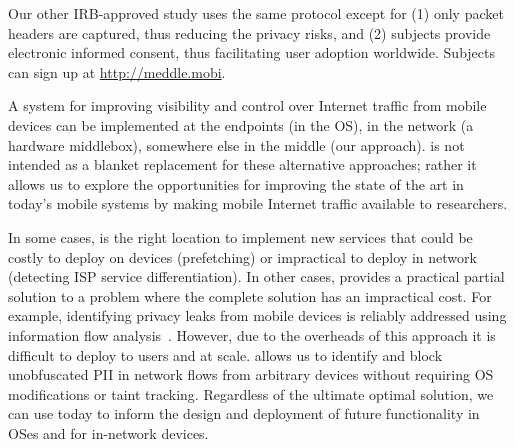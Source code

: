 Our other IRB-approved \meddle study uses the same protocol except 
for (1) only packet headers are captured, thus reducing the privacy risks, 
and (2) subjects provide electronic informed 
consent, thus facilitating user adoption worldwide. Subjects can sign up at \url{http://meddle.mobi}.

 A system for improving visibility and control over Internet traffic from mobile 
devices can be implemented at the endpoints (\eg in the OS), in the network (\eg a hardware middlebox), 
somewhere else in the middle (our approach). \meddle is not intended as a blanket replacement for 
these alternative approaches; rather it allows us to explore the opportunities for improving the state of the 
art in today's mobile systems by making mobile Internet traffic available to researchers. 

In some cases, \meddle is the right location to implement new services that could be costly 
to deploy on devices (prefetching) or impractical to deploy in network (detecting ISP service differentiation). 
In other cases, \meddle provides a practical partial solution to a problem where the complete solution has an impractical 
cost. For example, identifying privacy leaks from mobile devices is reliably addressed using information flow 
analysis~\cite{enck:taintdroid}. However, due to the overheads of this approach it is difficult to deploy to users 
and at scale. \meddle allows us to identify and block unobfuscated PII in network flows from arbitrary devices without requiring 
OS modifications or taint tracking. Regardless of the ultimate optimal solution, we can use \meddle today to inform the design 
and deployment of future functionality in OSes and for in-network devices. 




